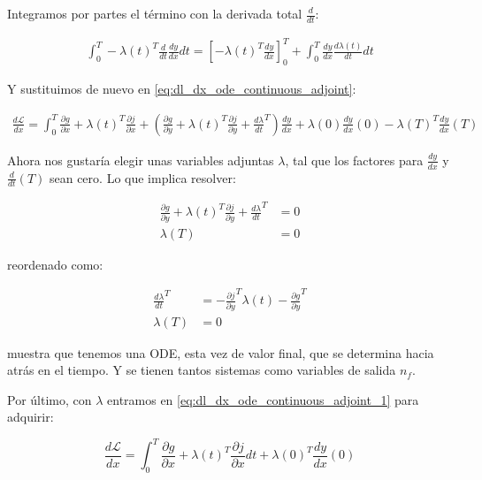 Integramos por partes el término con la derivada total $\frac{d}{dt}$:

\begin{align}
	\int_0^T -\lambda(t)^T \frac{d}{dt} \frac{dy}{dx} dt = \left[ -\lambda(t)^T \frac{dy}{dx} \right]^T_0 + \int_0^T \frac{dy}{dx} \frac{d\lambda(t)}{dt} dt
\end{align}

Y sustituimos de nuevo en \eqref{eq:dl_dx_ode_continuous_adjoint}:

\begin{align}
	\frac{d \mathcal{L}}{d x} = \int_0^T  \frac{\partial g}{\partial x} + \lambda(t)^T  \frac{\partial j}{\partial x} + \left(  \frac{\partial g}{\partial y} + \lambda(t)^T  \frac{\partial j}{\partial y} + \frac{d \lambda}{dt}^T  \right)  \frac{dy}{dx} + \lambda(0) \frac{dy}{dx}(0) - \lambda(T)^T  \frac{dy}{dx}(T)  \label{eq:dl_dx_ode_continuous_adjoint_1}
\end{align}

Ahora nos gustaría elegir unas variables adjuntas $\lambda$, tal que los
factores para $\frac{dy}{dx}$ y $\frac{d}{dt}(T)$ sean cero. Lo que implica
resolver:

\begin{align}
	\frac{\partial g}{\partial y} + \lambda(t)^T  \frac{\partial j}{\partial y} + \frac{d \lambda}{dt}^T & = 0 \\
	\lambda(T)                                                                                           & = 0
\end{align}

reordenado como:

\begin{align}
	\frac{d \lambda}{dt}^T & = -\frac{\partial j}{\partial y}^T \lambda(t) - \frac{\partial g}{\partial y}^T \\
	\lambda(T)             & = 0
\end{align}

muestra que tenemos una ODE, esta vez de valor final, que se determina hacia
atrás en el tiempo. Y se tienen tantos sistemas como variables de salida $n_f$.

Por último, con $\lambda$ entramos en \eqref{eq:dl_dx_ode_continuous_adjoint_1}
para adquirir:

\begin{equation}
	\frac{d \mathcal{L}}{d x} = \int_0^T \frac{\partial g}{\partial x} + \lambda(t)^T \frac{\partial j}{\partial x} dt + \lambda(0)^T \frac{dy}{dx}(0)
\end{equation}

